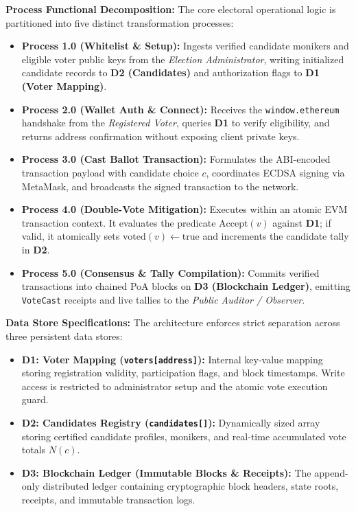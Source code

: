\documentclass[12pt,a4paper]{report}
\begin{document}
\noindent\textbf{Process Functional Decomposition:}
The core electoral operational logic is partitioned into five distinct transformation processes:
\begin{itemize}
    \setlength{\itemsep}{0pt}
    \setlength{\parskip}{0pt}
    \setlength{\parsep}{0pt}
    \item \textbf{Process 1.0 (Whitelist \& Setup):} Ingests verified candidate monikers and eligible voter public keys from the \textit{Election Administrator}, writing initialized candidate records to \textbf{D2 (Candidates)} and authorization flags to \textbf{D1 (Voter Mapping)}.
    \item \textbf{Process 2.0 (Wallet Auth \& Connect):} Receives the \texttt{window.ethereum} handshake from the \textit{Registered Voter}, queries \textbf{D1} to verify eligibility, and returns address confirmation without exposing client private keys.
    \item \textbf{Process 3.0 (Cast Ballot Transaction):} Formulates the ABI-encoded transaction payload with candidate choice $c$, coordinates ECDSA signing via MetaMask, and broadcasts the signed transaction to the network.
    \item \textbf{Process 4.0 (Double-Vote Mitigation):} Executes within an atomic EVM transaction context. It evaluates the predicate $\text{Accept}(v)$ against \textbf{D1}; if valid, it atomically sets $\text{voted}(v) \leftarrow \text{true}$ and increments the candidate tally in \textbf{D2}.
    \item \textbf{Process 5.0 (Consensus \& Tally Compilation):} Commits verified transactions into chained PoA blocks on \textbf{D3 (Blockchain Ledger)}, emitting \texttt{VoteCast} receipts and live tallies to the \textit{Public Auditor / Observer}.
\end{itemize}

\vspace{0.4em}
\noindent\textbf{Data Store Specifications:}
The architecture enforces strict separation across three persistent data stores:
\begin{itemize}
    \setlength{\itemsep}{0pt}
    \setlength{\parskip}{0pt}
    \setlength{\parsep}{0pt}
    \item \textbf{D1: Voter Mapping (\texttt{voters[address]}):} Internal key-value mapping storing registration validity, participation flags, and block timestamps. Write access is restricted to administrator setup and the atomic vote execution guard.
    \item \textbf{D2: Candidates Registry (\texttt{candidates[]}):} Dynamically sized array storing certified candidate profiles, monikers, and real-time accumulated vote totals $N(c)$.
    \item \textbf{D3: Blockchain Ledger (Immutable Blocks \& Receipts):} The append-only distributed ledger containing cryptographic block headers, state roots, receipts, and immutable transaction logs.
\end{itemize}
\end{document}
